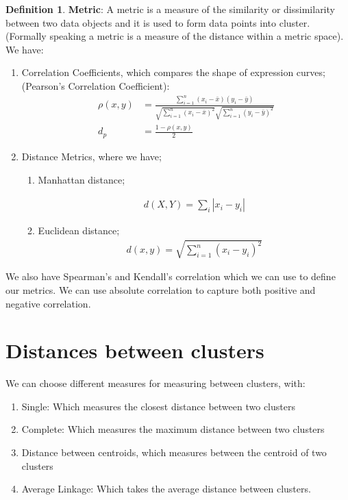 \documentclass[twoside]{article}
\theoremstyle{definition}
\theoremstyle{definition}
\newtheorem*{proof1}{Definition}
\newenvironment{ddef}{\begin{dBox}\begin{proof1}}{\hfill{\scriptsize}\end{proof1}\end{dBox}}
\begin{document}
\begin{ddef}
	\textbf{Metric}: A metric is a measure of the similarity or dissimilarity between two data objects and it is used to form data points into cluster. (Formally speaking a metric is a measure of the distance within a metric space). We have:

	\begin{enumerate}
		\item Correlation Coefficients, which compares the shape of expression curves; (Pearson's Correlation Coefficient):
			\begin{align}
				\rho(x,y) & = \frac{\sum^n_{i=1}(x_i-\bar{x})(y_i-\bar{y})}{\sqrt{\sum^n_{i=1}(x_i-\bar{x})^2}\sqrt{\sum^n_{i=1}(y_i-\bar{y})^2}}\\
				d_p & = \frac{1-\rho(x,y)}{2}
			\end{align}
		\item Distance Metrics, where we have; 
			\begin{enumerate}
				\item Manhattan distance;

					\begin{align*}
						d(X,Y) = \sum_i|x_i - y_i|
					\end{align*}
				\item Euclidean distance;
					\begin{align*}
					d(x,y) = \sqrt{\sum^n_{i=1} (x_i - y_i)^2}
				\end{align*}
			\end{enumerate}

	\end{enumerate}
	We also have Spearman's and Kendall's correlation which we can use to define our metrics. We can use absolute correlation to capture both positive and negative correlation. 
\end{ddef}
\section{Distances between clusters}
We can choose different measures for measuring between clusters, with:
\begin{enumerate}
	\item Single: Which measures the closest distance between two clusters
	\item Complete: Which measures the maximum distance between two clusters
	\item Distance between centroids, which measures between the centroid of two clusters
	\item Average Linkage: Which takes the average distance between clusters. 
\end{enumerate}
\end{document}
